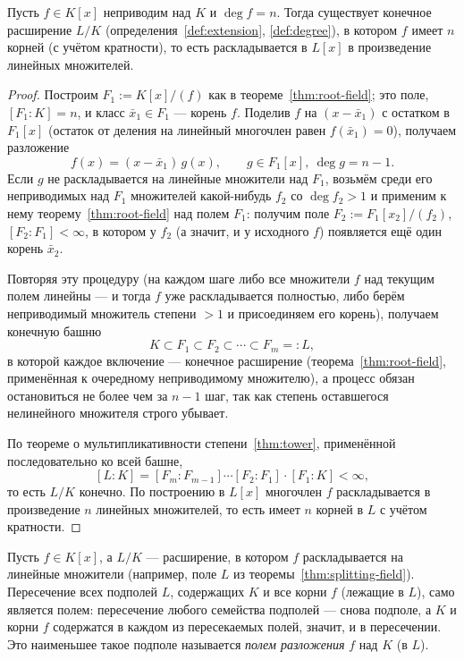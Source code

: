 \documentclass[12pt]{article}
\begin{document}
    \begin{theorem}\label{thm:splitting-field}
    	Пусть $f \in K[x]$ неприводим над $K$ и $\deg f = n$. Тогда существует конечное расширение $L/K$ (определения~\ref{def:extension}, \ref{def:degree}), в котором $f$ имеет $n$ корней (с учётом кратности), то есть раскладывается в $L[x]$ в произведение линейных множителей.
    \end{theorem}
    \begin{proof}
    	Построим $F_1 := K[x]/(f)$ как в теореме~\ref{thm:root-field}; это поле, $[F_1:K]=n$, и класс $\bar x_1 \in F_1$ --- корень $f$. Поделив $f$ на $(x-\bar x_1)$ с остатком в $F_1[x]$ (остаток от деления на линейный многочлен равен $f(\bar x_1)=0$), получаем разложение
    	\[
    	f(x) = (x - \bar x_1)\, g(x), \qquad g \in F_1[x],\ \deg g = n-1.
    	\]
    	Если $g$ не раскладывается на линейные множители над $F_1$, возьмём среди его неприводимых над $F_1$ множителей какой-нибудь $f_2$ со $\deg f_2 > 1$ и применим к нему теорему~\ref{thm:root-field} над полем $F_1$: получим поле $F_2 := F_1[x_2]/(f_2)$, $[F_2:F_1] < \infty$, в котором у $f_2$ (а значит, и у исходного $f$) появляется ещё один корень $\bar x_2$.
    
    	Повторяя эту процедуру (на каждом шаге либо все множители $f$ над текущим полем линейны --- и тогда $f$ уже раскладывается полностью, либо берём неприводимый множитель степени $>1$ и присоединяем его корень), получаем конечную башню
    	\[
    	K \subset F_1 \subset F_2 \subset \cdots \subset F_m =: L,
    	\]
    	в которой каждое включение --- конечное расширение (теорема~\ref{thm:root-field}, применённая к очередному неприводимому множителю), а процесс обязан остановиться не более чем за $n-1$ шаг, так как степень оставшегося нелинейного множителя строго убывает.
    
    	По теореме о мультипликативности степени~\ref{thm:tower}, применённой последовательно ко всей башне,
    	\[
    	[L:K] = [F_m:F_{m-1}]\cdots[F_2:F_1]\cdot[F_1:K] < \infty,
    	\]
    	то есть $L/K$ конечно. По построению в $L[x]$ многочлен $f$ раскладывается в произведение $n$ линейных множителей, то есть имеет $n$ корней в $L$ с учётом кратности.
    \end{proof}
    
    \begin{definition}\label{def:splitting-field}
    	Пусть $f \in K[x]$, а $L/K$ --- расширение, в котором $f$ раскладывается на линейные множители (например, поле $L$ из теоремы~\ref{thm:splitting-field}). Пересечение всех подполей $L$, содержащих $K$ и все корни $f$ (лежащие в $L$), само является полем: пересечение любого семейства подполей --- снова подполе, а $K$ и корни $f$ содержатся в каждом из пересекаемых полей, значит, и в пересечении. Это наименьшее такое подполе называется \emph{полем разложения} $f$ над $K$ (в $L$).
    \end{definition}
    
\end{document}
